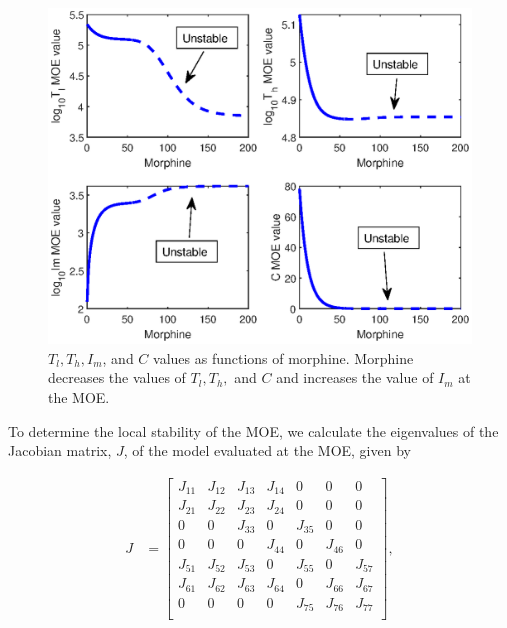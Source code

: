 \documentclass[11pt, oneside]{article}    %
\begin{document}
\begin{figure}[H]
\begin{center}
\includegraphics[scale=0.9]{other_MOEs.eps}
\caption{$T_l,T_h,I_m$, and $C$ values as functions of morphine. Morphine decreases the values of $T_l, T_h,$ and $C$ and increases the value of $I_m$ at the MOE.}
\label{fig:other_MOEs}
\end{center}
\end{figure}


To determine the local stability of the MOE, we calculate the eigenvalues of the Jacobian matrix, $J$, of the model evaluated at the MOE, given by

\begin{align*}
J & = \begin{bmatrix}
J_{11} & J_{12} & J_{13} & J_{14} & 0 & 0 & 0\\
J_{21} & J_{22} & J_{23} & J_{24} & 0 & 0 & 0\\
0 & 0 & J_{33} & 0 & J_{35} & 0 & 0\\
0 & 0 & 0 & J_{44} & 0 & J_{46} & 0 \\
J_{51} & J_{52} & J_{53} & 0 &J_{55} & 0 &J_{57}\\
J_{61} &J_{62} & J_{63} & J_{64} & 0 &J_{66} &  J_{67}\\
0 & 0 & 0 & 0 & J_{75} & J_{76} &J_{77}\\
\end{bmatrix},
\end{align*}
\end{document}
